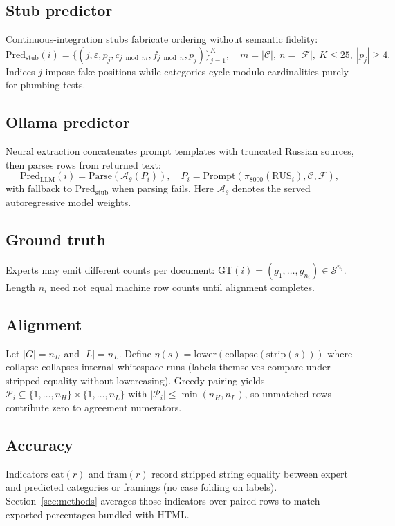 \documentclass[11pt,a4paper]{article}
\theoremstyle{remark}
\newcommand{\Pred}{\mathrm{Pred}}
\newcommand{\GT}{\mathrm{GT}}
\begin{document}
\subsection{Stub predictor}
Continuous-integration stubs fabricate ordering without semantic fidelity:
\[
\Pred_{\mathrm{stub}}(i)=\{(j,\varepsilon,p_j,c_{j\bmod m},f_{j\bmod n},p_j)\}_{j=1}^K,\quad m=|\mathcal{C}|,\ n=|\mathcal{F}|,\ K\le 25,\ |p_j|\ge 4.
\]
Indices $j$ impose fake positions while categories cycle modulo cardinalities purely for plumbing tests.

\subsection{Ollama predictor}
Neural extraction concatenates prompt templates with truncated Russian sources, then parses rows from returned text:
\[
\Pred_{\mathrm{LLM}}(i)=\mathrm{Parse}(\mathcal{A}_\theta(P_i)),\quad P_i=\mathrm{Prompt}(\pi_{8000}(\mathrm{RUS}_i),\mathcal{C},\mathcal{F}),
\]
with fallback to $\Pred_{\mathrm{stub}}$ when parsing fails. Here $\mathcal{A}_\theta$ denotes the served autoregressive model weights.

\subsection{Ground truth}
Experts may emit different counts per document: $\GT(i)=(g_1,\ldots,g_{n_i})\in\mathcal{S}^{n_i}$. Length $n_i$ need not equal machine row counts until alignment completes.

\subsection{Alignment}
Let $|G|=n_H$ and $|L|=n_L$. Define $\eta(s)=\mathrm{lower}(\mathrm{collapse}(\mathrm{strip}(s)))$ where $\mathrm{collapse}$ collapses internal whitespace runs (labels themselves compare under stripped equality without lowercasing). Greedy pairing yields $\mathcal{P}_i\subseteq\{1,\ldots,n_H\}\times\{1,\ldots,n_L\}$ with $|\mathcal{P}_i|\le\min(n_H,n_L)$, so unmatched rows contribute zero to agreement numerators.

\subsection{Accuracy}
Indicators $\mathrm{cat}(r)$ and $\mathrm{fram}(r)$ record stripped string equality between expert and predicted categories or framings (no case folding on labels). Section~\ref{sec:methods} averages those indicators over paired rows to match exported percentages bundled with HTML.
\end{document}
